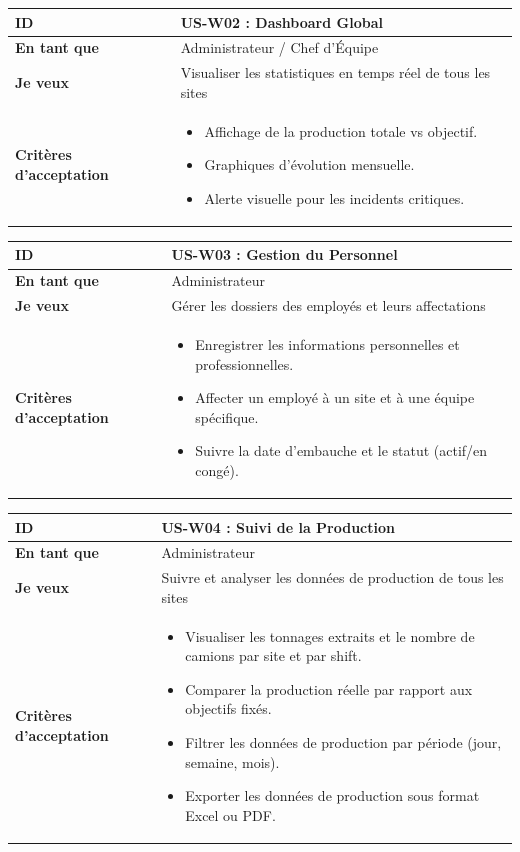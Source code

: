 \documentclass[12pt,a4paper]{article}
\begin{document}
\begin{longtable}{|p{3cm}|p{12cm}|}
\hline
\textbf{ID} & \textbf{US-W02 : Dashboard Global} \\ \hline
\textbf{En tant que} & Administrateur / Chef d'Équipe \\ \hline
\textbf{Je veux} & Visualiser les statistiques en temps réel de tous les sites \\ \hline
\textbf{Critères d'acceptation} & 
\begin{itemize}[nosep, leftmargin=*]
    \item Affichage de la production totale vs objectif.
    \item Graphiques d'évolution mensuelle.
    \item Alerte visuelle pour les incidents critiques.
\end{itemize} \\ \hline
\end{longtable}

\begin{longtable}{|p{3cm}|p{12cm}|}
\hline
\textbf{ID} & \textbf{US-W03 : Gestion du Personnel} \\ \hline
\textbf{En tant que} & Administrateur \\ \hline
\textbf{Je veux} & Gérer les dossiers des employés et leurs affectations \\ \hline
\textbf{Critères d'acceptation} & 
\begin{itemize}[nosep, leftmargin=*]
    \item Enregistrer les informations personnelles et professionnelles.
    \item Affecter un employé à un site et à une équipe spécifique.
    \item Suivre la date d'embauche et le statut (actif/en congé).
\end{itemize} \\ \hline
\end{longtable}

\begin{longtable}{|p{3cm}|p{12cm}|}
\hline
\textbf{ID} & \textbf{US-W04 : Suivi de la Production} \\ \hline
\textbf{En tant que} & Administrateur \\ \hline
\textbf{Je veux} & Suivre et analyser les données de production de tous les sites \\ \hline
\textbf{Critères d'acceptation} & 
\begin{itemize}[nosep, leftmargin=*]
    \item Visualiser les tonnages extraits et le nombre de camions par site et par shift.
    \item Comparer la production réelle par rapport aux objectifs fixés.
    \item Filtrer les données de production par période (jour, semaine, mois).
    \item Exporter les données de production sous format Excel ou PDF.
\end{itemize} \\ \hline
\end{longtable}
\end{document}
